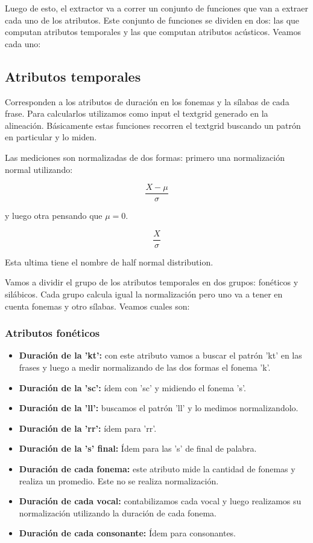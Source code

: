 \documentclass[11pt,a4paper,twoside]{tesis}
\begin{document}
Luego de esto, el extractor va a correr un conjunto de funciones que van a extraer cada uno de los atributos. Este conjunto de funciones se dividen en dos: las que computan atributos temporales y las que computan atributos acústicos. Veamos cada uno:

\subsection{Atributos temporales}

Corresponden a los atributos de duración en los fonemas y la sílabas de cada frase. Para calcularlos utilizamos como input el textgrid generado en la alineación. Básicamente estas funciones recorren el textgrid buscando un patrón en particular y lo miden.

Las mediciones son normalizadas de dos formas: primero una normalización normal utilizando:

\hspace{2cm} \[\frac{X - \mu }{ \sigma }\]

y luego otra pensando que $\mu = 0$. 

\hspace{2cm} \[\frac{X}{ \sigma }\]

Esta ultima tiene el nombre de half normal distribution.


Vamos a dividir el grupo de los atributos temporales en dos grupos: fonéticos y silábicos. Cada grupo calcula igual la normalización pero uno va a tener en cuenta fonemas y otro sílabas. Veamos cuales son:

\subsubsection{Atributos fonéticos}

\begin{itemize}
    \item \textbf{Duración de la 'kt':} con este atributo vamos a buscar el patrón 'kt' en las frases y luego a medir normalizando de las dos formas el fonema 'k'.  
    \item \textbf{Duración de la 'sc':} ídem con 'sc' y midiendo el fonema 's'.
    \item \textbf{Duración de la 'll':} buscamos el patrón 'll' y lo medimos normalizandolo.
    \item \textbf{Duración de la 'rr':} ídem para 'rr'.
    \item \textbf{Duración de la 's' final:} Ídem para las 's' de final de palabra.
    
    \item \textbf{Duración de cada fonema:} este atributo mide la cantidad de fonemas y realiza un promedio. Este no se realiza normalización.  
    \item \textbf{Duración de cada vocal:} contabilizamos cada vocal y luego realizamos su normalización utilizando la duración de cada fonema.
    \item \textbf{Duración de cada consonante:} Ídem para consonantes. 
\end{itemize}
\end{document}
